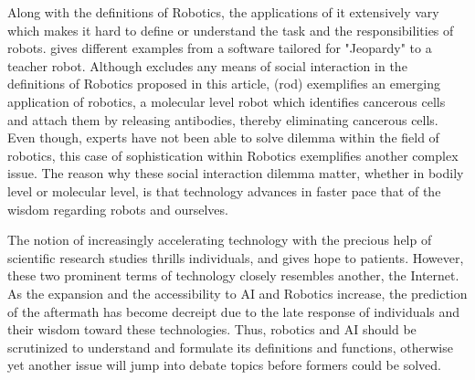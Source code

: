 \documentclass[man]{apa6}
\begin{document}
Along with the definitions of Robotics, the applications of it extensively vary which makes it hard to define or understand the task and the responsibilities of robots.  gives different examples from a software tailored for "Jeopardy" to a teacher robot. Although  excludes any means of social interaction in the definitions of Robotics proposed in this article, \citeA(rod) exemplifies an emerging application of robotics, a molecular level robot which identifies cancerous cells and attach them by releasing antibodies, thereby eliminating cancerous cells. Even though, experts have not been able to solve dilemma within the field of robotics, this case of sophistication within Robotics exemplifies another complex issue. The reason why these social interaction dilemma matter, whether in bodily level or molecular level, is that technology advances in faster pace that of the wisdom regarding robots and ourselves.\par
The notion of increasingly accelerating technology with the precious help of scientific research studies thrills individuals, and gives hope to patients. However, these two prominent terms of technology closely resembles another, the Internet. As the expansion and the accessibility to AI and Robotics increase, the prediction of the aftermath has become decreipt due to the late response of individuals and their wisdom toward these technologies. Thus, robotics and AI should be scrutinized to understand and formulate its definitions and functions, otherwise yet another issue will jump into debate topics before formers could be solved.
\end{document}
